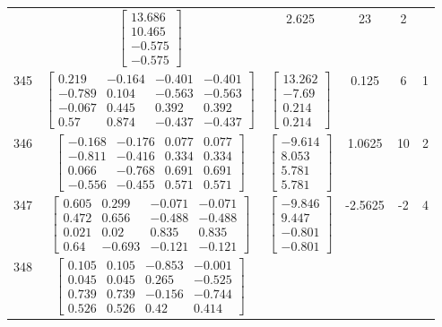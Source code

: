 \documentclass[a4paper,12pt]{article}
\begin{document}
\begin{tabular}{c c c c c c}
&
$\begin{bmatrix} 13.686 \\ 10.465 \\ -0.575 \\ -0.575 \end{bmatrix}$
&
2.625
&
23
&
2
\\
345
&
$\begin{bmatrix} 0.219 & -0.164 & -0.401 & -0.401 \\ -0.789 & 0.104 & -0.563 & -0.563 \\ -0.067 & 0.445 & 0.392 & 0.392 \\ 0.57 & 0.874 & -0.437 & -0.437 \end{bmatrix}$
&
$\begin{bmatrix} 13.262 \\ -7.69 \\ 0.214 \\ 0.214 \end{bmatrix}$
&
0.125
&
6
&
1
\\
346
&
$\begin{bmatrix} -0.168 & -0.176 & 0.077 & 0.077 \\ -0.811 & -0.416 & 0.334 & 0.334 \\ 0.066 & -0.768 & 0.691 & 0.691 \\ -0.556 & -0.455 & 0.571 & 0.571 \end{bmatrix}$
&
$\begin{bmatrix} -9.614 \\ 8.053 \\ 5.781 \\ 5.781 \end{bmatrix}$
&
1.0625
&
10
&
2
\\
347
&
$\begin{bmatrix} 0.605 & 0.299 & -0.071 & -0.071 \\ 0.472 & 0.656 & -0.488 & -0.488 \\ 0.021 & 0.02 & 0.835 & 0.835 \\ 0.64 & -0.693 & -0.121 & -0.121 \end{bmatrix}$
&
$\begin{bmatrix} -9.846 \\ 9.447 \\ -0.801 \\ -0.801 \end{bmatrix}$
&
-2.5625
&
-2
&
4
\\
348
&
$\begin{bmatrix} 0.105 & 0.105 & -0.853 & -0.001 \\ 0.045 & 0.045 & 0.265 & -0.525 \\ 0.739 & 0.739 & -0.156 & -0.744 \\ 0.526 & 0.526 & 0.42 & 0.414 \end{bmatrix}$

\end{tabular}
\end{document}
